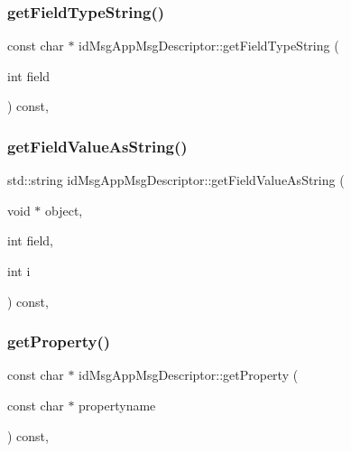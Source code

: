 \subsubsection{\texorpdfstring{get\+Field\+Type\+String()}{getFieldTypeString()}}
{\footnotesize\ttfamily const char $\ast$ id\+Msg\+App\+Msg\+Descriptor\+::get\+Field\+Type\+String (\begin{DoxyParamCaption}\item[{int}]{field }\end{DoxyParamCaption}) const\hspace{0.3cm}{\ttfamily [override]}, {\ttfamily [virtual]}}

\mbox{\label{classidMsgAppMsgDescriptor_a42e71d687276c6b4ffd5d812eb9216a3}} 
\subsubsection{\texorpdfstring{get\+Field\+Value\+As\+String()}{getFieldValueAsString()}}
{\footnotesize\ttfamily std\+::string id\+Msg\+App\+Msg\+Descriptor\+::get\+Field\+Value\+As\+String (\begin{DoxyParamCaption}\item[{void $\ast$}]{object,  }\item[{int}]{field,  }\item[{int}]{i }\end{DoxyParamCaption}) const\hspace{0.3cm}{\ttfamily [override]}, {\ttfamily [virtual]}}

\mbox{\label{classidMsgAppMsgDescriptor_ac9b9240ff817b217015861a922206080}} 
\subsubsection{\texorpdfstring{get\+Property()}{getProperty()}}
{\footnotesize\ttfamily const char $\ast$ id\+Msg\+App\+Msg\+Descriptor\+::get\+Property (\begin{DoxyParamCaption}\item[{const char $\ast$}]{propertyname }\end{DoxyParamCaption}) const\hspace{0.3cm}{\ttfamily [override]}, {\ttfamily [virtual]}}

